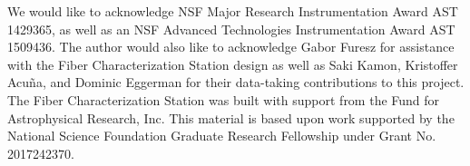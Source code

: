 \documentclass[twocolumn]{emulateapj}
\begin{document}
\acknowledgments

We would like to acknowledge NSF Major Research Instrumentation Award AST 1429365, as well as an NSF Advanced Technologies Instrumentation Award AST 1509436. The author would also like to acknowledge Gabor Furesz for assistance with the Fiber Characterization Station design as well as Saki Kamon, Kristoffer Acu\~na, and Dominic Eggerman for their data-taking contributions to this project. The Fiber Characterization Station was built with support from the Fund for Astrophysical Research, Inc. This material is based upon work supported by the National Science Foundation Graduate Research Fellowship under Grant No. 2017242370.

\end{document}

